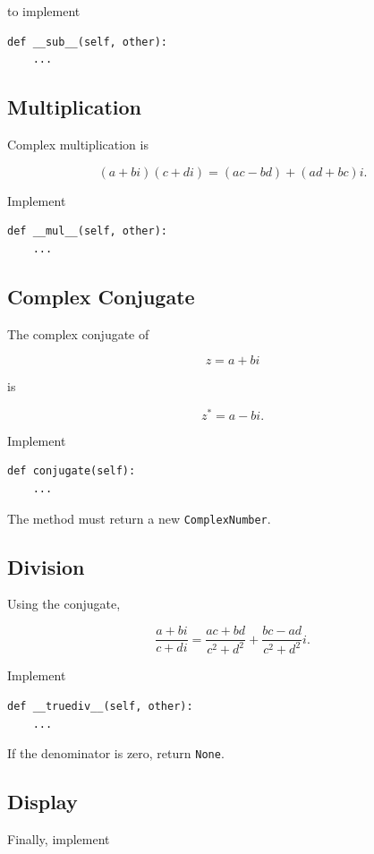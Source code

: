 \documentclass{article}
\begin{document}
to implement

\begin{verbatim}
def __sub__(self, other):
    ...
\end{verbatim}

\subsection*{Multiplication}

Complex multiplication is

\[
(a+bi)(c+di)
=
(ac-bd)+(ad+bc)i.
\]

Implement

\begin{verbatim}
def __mul__(self, other):
    ...
\end{verbatim}

\subsection*{Complex Conjugate}

The complex conjugate of

\[
z=a+bi
\]

is

\[
z^*=a-bi.
\]

Implement

\begin{verbatim}
def conjugate(self):
    ...
\end{verbatim}

The method must return a new \texttt{ComplexNumber}.

\subsection*{Division}

Using the conjugate,

\[
\frac{a+bi}{c+di}
=
\frac{ac+bd}{c^2+d^2}
+
\frac{bc-ad}{c^2+d^2}i.
\]

Implement

\begin{verbatim}
def __truediv__(self, other):
    ...
\end{verbatim}

If the denominator is zero, return \texttt{None}.

\subsection*{Display}

Finally, implement
\end{document}
